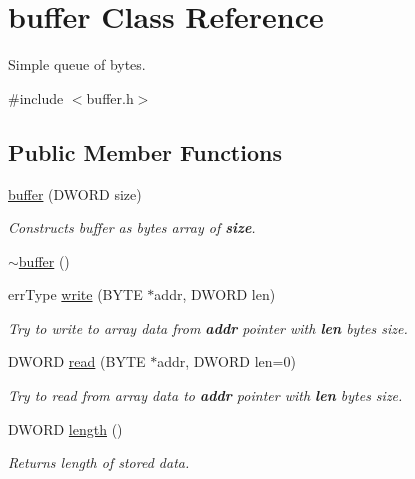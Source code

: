 \hypertarget{classbuffer}{
\section{buffer Class Reference}
\label{da/d40/classbuffer}
}


Simple queue of bytes.  




{\ttfamily \#include $<$buffer.h$>$}

\subsection*{Public Member Functions}
\begin{DoxyCompactItemize}
\item 
\hyperlink{classbuffer_a65bd401aac7064d2f1f5a67c3fe6c97e}{buffer} (DWORD size)
\begin{DoxyCompactList}\small\item\em Constructs buffer as bytes array of {\bfseries size}. \item\end{DoxyCompactList}\item 
\hyperlink{classbuffer_a2676a1a64b89fd492537129a618b88cf}{$\sim$buffer} ()
\item 
errType \hyperlink{classbuffer_a5e510e2da347809a6bc181b77f5c7e95}{write} (BYTE $\ast$addr, DWORD len)
\begin{DoxyCompactList}\small\item\em Try to write to array data from {\bfseries addr} pointer with {\bfseries len} bytes size. \item\end{DoxyCompactList}\item 
DWORD \hyperlink{classbuffer_af2e7e8bdfac867843d3ac15ac335d582}{read} (BYTE $\ast$addr, DWORD len=0)
\begin{DoxyCompactList}\small\item\em Try to read from array data to {\bfseries addr} pointer with {\bfseries len} bytes size. \item\end{DoxyCompactList}\item 
DWORD \hyperlink{classbuffer_abfbcac007f4613e9b638da7486c49583}{length} ()
\begin{DoxyCompactList}\small\item\em Returns length of stored data. \item\end{DoxyCompactList}\item 

\end{DoxyCompactItemize}
